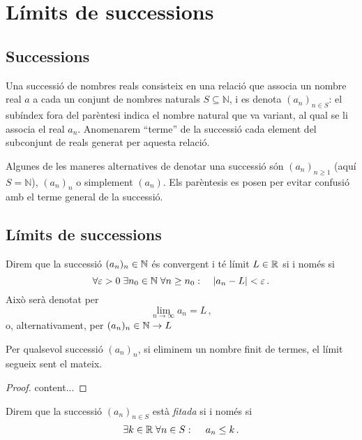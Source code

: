\chapter{Límits de successions}

\newcommand{\succession}[2][n]{({#2}_n)_{#1}}

\section{Successions}

\begin{defi*}[Successió]
	Una successió de nombres reals consisteix en una relació que associa un nombre real $a$ a cada un conjunt de nombres naturals $S\subseteq\mathbb{N}$, i es denota $(a_n)_{n\in S}$: el subíndex fora del parèntesi indica el nombre natural que va variant, al qual se li associa el real $a_n$. Anomenarem ``terme'' de la successió cada element del subconjunt de reals generat per aquesta relació.
\end{defi*}

Algunes de les maneres alternatives de denotar una successió són $(a_n)_{n\geq1}$ (aquí $S=\mathbb{N}$), $(a_n)_n$ o simplement $(a_n)$. Els parèntesis es posen per evitar confusió amb el terme general de la successió.

\section{Límits de successions}
\begin{defi*}
	Direm que la successió $(a_n)_n\in\mathbb{N}$ és convergent i té límit $L\in\mathbb{R}$ si i només si
	\[
	\forall\varepsilon>0\; \exists n_0\in\mathbb{N}\; \forall n \ge n_0\operatorname{\colon\quad}
	\abs{a_n - L} < \varepsilon\,.
	\]
	Això serà denotat per
	\[
	\lim\limits_{n\to\infty} a_n = L\,,
	\]
	o, alternativament, per $(a_n)_n\in\mathbb{N} \to L$
\end{defi*}

\begin{prop}
	Per qualsevol successió $\succession{a}$, si eliminem un nombre finit de termes, el límit segueix sent el mateix.
	\begin{proof}
		content...
	\end{proof}
\end{prop}

\begin{defi}
	Direm que la successió $\succession[n\in S]{a}$ està \textit{fitada} si i només si \[\exists k\in\mathbb{R}\; \forall n \in S \operatorname{\colon\quad} a_n \le k\,. \]
\end{defi}

